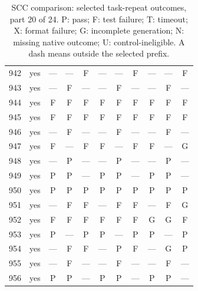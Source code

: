 \begin{table}[p]
\begin{tabular*}{\textwidth}{@{\extracolsep{\fill}}rc*{9}{c}@{}}
942 & yes & — & — & F & — & — & F & — & — & F\\
943 & yes & — & F & — & — & F & — & — & F & —\\
944 & yes & F & F & F & F & F & F & F & F & F\\
945 & yes & F & F & F & F & F & F & F & F & F\\
946 & yes & — & F & — & — & F & — & — & F & —\\
947 & yes & F & — & F & F & — & F & F & — & G\\
948 & yes & — & P & — & — & P & — & — & P & —\\
949 & yes & P & P & — & P & P & — & P & P & —\\
950 & yes & P & P & P & P & P & P & P & P & P\\
951 & yes & — & F & F & — & F & F & — & F & G\\
952 & yes & F & F & F & F & F & F & G & G & F\\
953 & yes & P & — & P & P & — & P & P & — & P\\
954 & yes & — & F & F & — & P & F & — & G & P\\
955 & yes & — & F & — & — & F & — & — & F & —\\
956 & yes & P & P & — & P & P & — & P & P & —\\
\bottomrule\end{tabular*}
\caption{SCC comparison: selected task-repeat outcomes, part 20 of 24. P: pass; F: test failure; T: timeout; X: format failure; G: incomplete generation; N: missing native outcome; U: control-ineligible. A dash means outside the selected prefix.}
\end{table}
\clearpage
